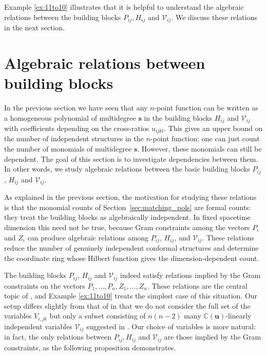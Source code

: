 \documentclass[12pt,a4paper]{extarticle}
\theoremstyle{definition}
\begin{document}
Example \ref{ex:11to10} illustrates that it is helpful to understand the algebraic relations between the building blocks  $P_{ij}, H_{ij}$ and $\mathcal{V}_{ij}$. We discuss these relations in the next section.


\section{Algebraic relations between building blocks}\label{sec: alg rel}

In the previous section we have seen that any $n$-point function can be written as a homogeneous polynomial of multidegree $\mathbf{s}$ in the building blocks $H_{ij}$ and $\mathcal{V}_{ij}$ with coefficients depending on the cross-ratios $u_{ijkl}$. 
This gives an upper bound on the number of independent structures in the $n$-point function: one can just count the number of monomials of multidegree $\mathbf{s}$.
However, these monomials can still be dependent. 
The goal of this section is to investigate dependencies between them. In other words, we study algebraic relations between the basic building blocks $P_{ij}$, $H_{ij}$ and $\mathcal{V}_{ij}$. 

\medskip

As explained in the previous section, the motivation for studying these relations is that the monomial counts of Section~\ref{sec:matching_pols} are formal counts: they treat the building blocks as algebraically independent. In fixed spacetime dimension this need not be true, because Gram constraints among the vectors $P_i$ and $Z_i$ can produce algebraic relations among $P_{ij}$, $H_{ij}$, and $\mathcal V_{ij}$. These relations reduce the number of genuinely independent conformal structures and determine the coordinate ring whose Hilbert function gives the dimension-dependent count.

\medskip

The building blocks $P_{ij}$, $H_{ij}$ and $\mathcal{V}_{ij}$ indeed satisfy relations implied by the Gram constraints on the vectors $P_1,\ldots,P_n,Z_1,\ldots,Z_n$. 
These relations are the central topic of \cite{MSS}, and Example \ref{ex:11to10} treats the simplest case of this situation. 
Our setup differs slightly from that of \cite{MSS} in that we do not consider the full set of the variables $V_{i,jk}$ but only a subset consisting of $n(n-2)$ many  $\mathbb{C}(\mathbf{u})$-linearly independent variables $\mathcal{V}_{ij}$ suggested in \cite[Eqn. (4.75)]{CPPR}. 
Our choice of variables is more natural: in fact, the only relations between $P_{ij}, H_{ij}$ and $\mathcal{V}_{ij}$ are those implied by the Gram constraints, as the following proposition demonstrates. 
\end{document}
